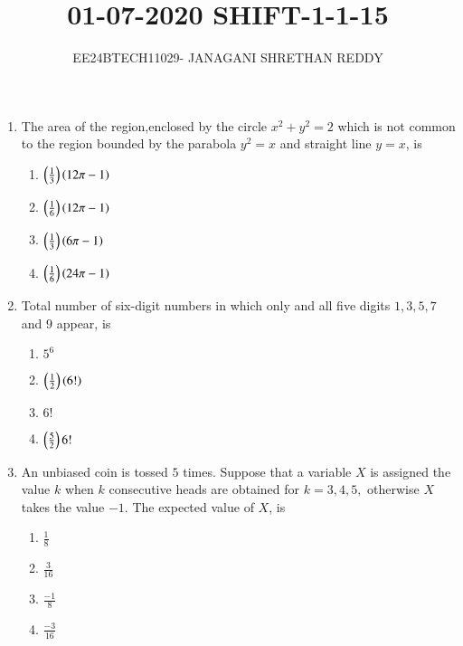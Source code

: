 \documentclass[journal,12pt,twocolumn]{IEEEtran}
\theoremstyle{remark}
\begin{document}
 


\vspace{3cm}

\title{01-07-2020 SHIFT-1-1-15}
\author{EE24BTECH11029- JANAGANI SHRETHAN REDDY}
\maketitle{}
\newpage
\bigskip
\renewcommand{\thefigure}{\theenumi}
\renewcommand{\thetable}{\theenum}
\begin{enumerate}
    \item The area of the region,enclosed by the circle $x^2+y^2=2$ which is not common to the region bounded by the parabola $y^2=x$ and straight line $y=x$, is
    \begin{enumerate}
        \item $\left(\frac{1}{3}\right)\left(12\pi-1\right)$
        \item $\left(\frac{1}{6}\right)\left(12\pi-1\right)$
        \item $\left(\frac{1}{3}\right)\left(6\pi-1\right)$
        \item $\left(\frac{1}{6}\right)\left(24\pi-1\right)$\\
    \end{enumerate}
    \item Total number of six-digit numbers in which only and all five digits $1,3,5,7$ and $9$ appear, is
    \begin{enumerate}
        \item $5^6$
        \item $\left(\frac{1}{2}\right)\left(6!\right)$
        \item $6!$
        \item $\left(\frac{5}{2}\right)6!$\\
    \end{enumerate}
    \item An unbiased coin is tossed $5$ times. Suppose that a variable $X$ is assigned the value $k$ when $k$ consecutive heads are obtained for  $k= 3, 4, 5,$ otherwise $X$ takes the value $-1$. The expected value of $X$, is
    \begin{enumerate}
        \item $\frac{1}{8}$
        \item $\frac{3}{16}$
        \item $\frac{-1}{8}$
        \item $\frac{-3}{16}$\\
    \end{enumerate}

\end{enumerate}
\end{document}
